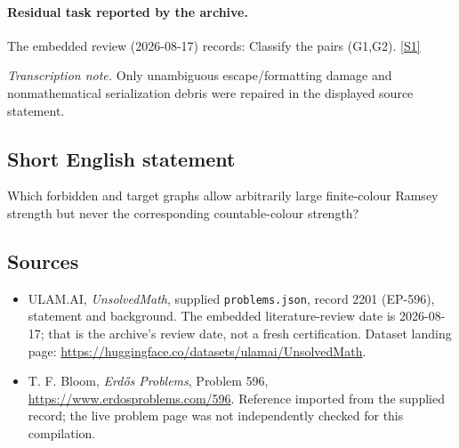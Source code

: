 \documentclass[11pt,a4paper]{article}
\newcommand{\sref}[2]{\hyperlink{source:#1:#2}{[S#2]}}
\begin{document}
\paragraph{Residual task reported by the archive.}

The embedded review (2026-08-17) records: Classify the pairs (G1,G2). \sref{2201}{1}

{\small\emph{Transcription note.} Only unambiguous escape/formatting damage and nonmathematical serialization debris were repaired in the displayed source statement.}

\subsection{Short English statement}

Which forbidden and target graphs allow arbitrarily large finite-colour Ramsey strength but never the corresponding countable-colour strength?

\subsection{Sources}

{\small

\begin{itemize}

\item[\hypertarget{source:2201:1}{S1}] ULAM.AI, \emph{UnsolvedMath}, supplied \texttt{problems.json}, record 2201 (EP-596), statement and background. The embedded literature-review date is 2026-08-17; that is the archive’s review date, not a fresh certification. Dataset landing page: \url{https://huggingface.co/datasets/ulamai/UnsolvedMath}.

\item[\hypertarget{source:2201:2}{S2}] T. F. Bloom, \emph{Erdős Problems}, Problem 596, \url{https://www.erdosproblems.com/596}. Reference imported from the supplied record; the live problem page was not independently checked for this compilation.

\end{itemize}

}

\label{end:2201}
\end{document}
